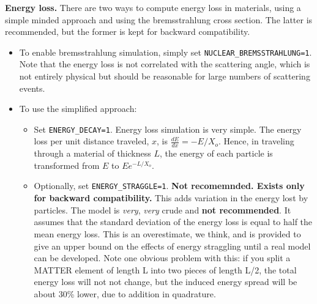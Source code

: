 {\bf Energy loss.} There are two ways to compute energy loss in materials, using a simple minded approach and using the bremsstrahlung cross section.
The latter is recommended, but the former is kept for backward compatibility. 
\begin{itemize}
\item To enable bremsstrahlung simulation, simply set \verb|NUCLEAR_BREMSSTRAHLUNG=1|. Note that the energy loss is not correlated with the scattering
  angle, which is not entirely physical but should be reasonable for large numbers of scattering events.
\item To use the simplified approach:
      \begin{itemize}
      \item  Set \verb|ENERGY_DECAY=1|. Energy loss simulation is very simple.
The energy loss per unit distance traveled, $x$, is 
$\frac{dE}{dx} = -E/X_o$.  Hence, in traveling through a
material of thickness $L$, the energy of each particle is
transformed from $E$ to $E e^{-L/X_o}$.  
       \item Optionally, set \verb|ENERGY_STRAGGLE=1|. {\bf Not recomemnded. Exists only for backward compatibility.}
This adds variation in the energy lost
by particles.  The model is {\em very}, {\em very} crude and {\bf not recommended}.  It assumes that the standard deviation of the energy
loss is equal to half the mean energy loss.  This is an overestimate,
we think, and is provided to give an upper bound on the effects of
energy straggling until a real model can be developed.  Note one
obvious problem with this: if you split a MATTER element of length L
into two pieces of length L/2, the total energy loss will not not
change, but the induced energy spread will be about 30\% lower, due to
addition in quadrature.
\end{itemize}
\end{itemize}
